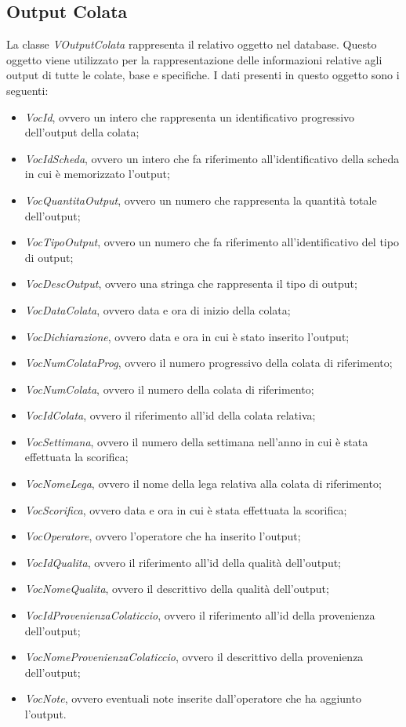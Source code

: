   \subsection{Output Colata}
  La classe \textit{VOutputColata} rappresenta il relativo oggetto nel database. Questo oggetto viene utilizzato per la
  rappresentazione delle informazioni relative agli output di tutte le colate, base e specifiche. I dati presenti in questo
  oggetto sono i seguenti:
  \begin{itemize}
    \item \textit{VocId}, ovvero un intero che rappresenta un identificativo progressivo dell'output della colata;
    \item \textit{VocIdScheda}, ovvero un intero che fa riferimento all'identificativo della scheda in cui è memorizzato
    l'output;
    \item \textit{VocQuantitaOutput}, ovvero un numero che rappresenta la quantità totale dell'output;
    \item \textit{VocTipoOutput}, ovvero un numero che fa riferimento all'identificativo del tipo di output;
    \item \textit{VocDescOutput}, ovvero una stringa che rappresenta il tipo di output;
    \item \textit{VocDataColata}, ovvero data e ora di inizio della colata;
    \item \textit{VocDichiarazione}, ovvero data e ora in cui è stato inserito l'output;
    \item \textit{VocNumColataProg}, ovvero il numero progressivo della colata di riferimento;
    \item \textit{VocNumColata}, ovvero il numero della colata di riferimento;
    \item \textit{VocIdColata}, ovvero il riferimento all'id della colata relativa;
    \item \textit{VocSettimana}, ovvero il numero della settimana nell'anno in cui è stata effettuata la scorifica;
    \item \textit{VocNomeLega}, ovvero il nome della lega relativa alla colata di riferimento;
    \item \textit{VocScorifica}, ovvero data e ora in cui è stata effettuata la scorifica;
    \item \textit{VocOperatore}, ovvero l'operatore che ha inserito l'output;
    \item \textit{VocIdQualita}, ovvero il riferimento all'id della qualità dell'output;
    \item \textit{VocNomeQualita}, ovvero il descrittivo della qualità dell'output;
    \item \textit{VocIdProvenienzaColaticcio}, ovvero il riferimento all'id della provenienza dell'output;
    \item \textit{VocNomeProvenienzaColaticcio}, ovvero il descrittivo della provenienza dell'output;
    \item \textit{VocNote}, ovvero eventuali note inserite dall'operatore che ha aggiunto l'output.
  \end{itemize}
  

